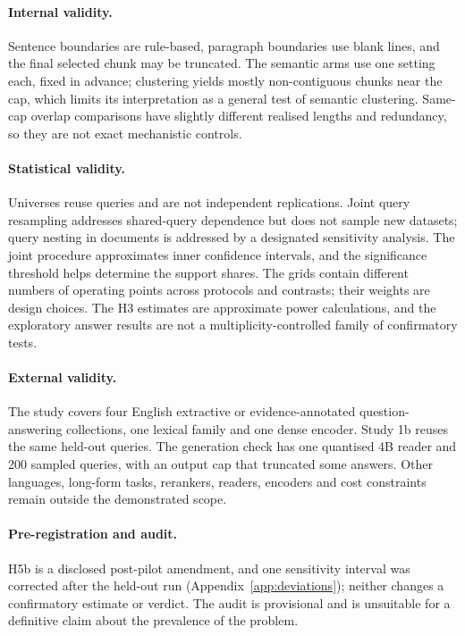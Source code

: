 \documentclass[11pt]{article}
\begin{document}
\paragraph{Internal validity.}
Sentence boundaries are rule-based, paragraph boundaries use blank lines, and the final selected chunk may be
truncated. The semantic arms use one setting each, fixed in advance; clustering yields mostly non-contiguous chunks
near the cap, which limits its interpretation as a general test of semantic clustering. Same-cap overlap comparisons
have slightly different realised lengths and redundancy, so they are not exact mechanistic controls.

\paragraph{Statistical validity.}
Universes reuse queries and are not independent replications. Joint query resampling addresses shared-query
dependence but does not sample new datasets; query nesting in documents is addressed by a designated sensitivity
analysis. The joint procedure approximates inner confidence intervals, and the significance threshold helps
determine the support shares. The grids contain different numbers of operating points across protocols and contrasts;
their weights are design choices. The H3 estimates are approximate power calculations, and the exploratory answer
results are not a multiplicity-controlled family of confirmatory tests.

\paragraph{External validity.}
The study covers four English extractive or evidence-annotated question-answering collections, one lexical family and
one dense encoder. Study 1b reuses the same held-out queries. The generation check has one quantised 4B reader and 200
sampled queries, with an output cap that truncated some answers. Other languages, long-form tasks, rerankers,
readers, encoders and cost constraints remain outside the demonstrated scope.

\paragraph{Pre-registration and audit.}
H5b is a disclosed post-pilot amendment, and one sensitivity interval was corrected after the held-out run
(Appendix~\ref{app:deviations}); neither changes a confirmatory estimate or verdict. The audit is provisional and is
unsuitable for a definitive claim about the prevalence of the problem.
\end{document}
